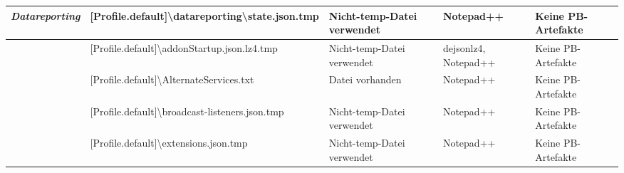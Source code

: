 \begin{appendices}
{\begin{landscape}
\begin{table}[h!]
{\begin{tabular}{cllll}
	\multicolumn{1}{|c|}{\multirow{-2}{*}{\textit{Datareporting}}}                                                & \multicolumn{1}{l|}{\cellcolor[HTML]{3190FF}[Profile.default]\textbackslash{}datareporting\textbackslash{}state.json.tmp}                                       & \multicolumn{1}{l|}{\cellcolor[HTML]{FCFF2F}Nicht-temp-Datei verwendet} & \multicolumn{1}{l|}{\cellcolor[HTML]{FFFFFF}Notepad++}            & \multicolumn{1}{l|}{\cellcolor[HTML]{F8A102}Keine PB-Artefakte} \\ \hline
	\multicolumn{1}{|c|}{}                                                                                        & \multicolumn{1}{l|}{\cellcolor[HTML]{3190FF}[Profile.default]\textbackslash{}addonStartup.json.lz4.tmp}                                                         & \multicolumn{1}{l|}{\cellcolor[HTML]{FCFF2F}Nicht-temp-Datei verwendet} & \multicolumn{1}{l|}{\cellcolor[HTML]{FFFFFF}dejsonlz4, Notepad++} & \multicolumn{1}{l|}{\cellcolor[HTML]{F8A102}Keine PB-Artefakte} \\ \cline{2-5} 
	\multicolumn{1}{|c|}{}                                                                                        & \multicolumn{1}{l|}{\cellcolor[HTML]{3190FF}[Profile.default]\textbackslash{}AlternateServices.txt}                                                             & \multicolumn{1}{l|}{\cellcolor[HTML]{009901}Datei vorhanden}            & \multicolumn{1}{l|}{\cellcolor[HTML]{FFFFFF}Notepad++}            & \multicolumn{1}{l|}{\cellcolor[HTML]{F8A102}Keine PB-Artefakte} \\ \cline{2-5} 
	\multicolumn{1}{|c|}{}                                                                                        & \multicolumn{1}{l|}{\cellcolor[HTML]{3190FF}[Profile.default]\textbackslash{}broadcast-listeners.json.tmp}                                                      & \multicolumn{1}{l|}{\cellcolor[HTML]{FCFF2F}Nicht-temp-Datei verwendet} & \multicolumn{1}{l|}{\cellcolor[HTML]{FFFFFF}Notepad++}            & \multicolumn{1}{l|}{\cellcolor[HTML]{F8A102}Keine PB-Artefakte} \\ \cline{2-5} 
	\multicolumn{1}{|c|}{}                                                                                        & \multicolumn{1}{l|}{\cellcolor[HTML]{3190FF}[Profile.default]\textbackslash{}extensions.json.tmp}                                                               & \multicolumn{1}{l|}{\cellcolor[HTML]{FCFF2F}Nicht-temp-Datei verwendet} & \multicolumn{1}{l|}{\cellcolor[HTML]{FFFFFF}Notepad++}            & \multicolumn{1}{l|}{\cellcolor[HTML]{F8A102}Keine PB-Artefakte} \\ \cline{2-5} 

\end{tabular}}
\end{table}
\end{landscape}}
\end{appendices}
